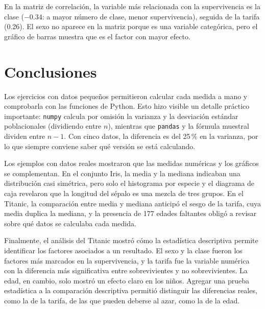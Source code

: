 \documentclass[11pt,letterpaper]{article}
\begin{document}
En la matriz de correlación, la variable más relacionada con la supervivencia es la clase ($-0.34$: a mayor número de clase, menor supervivencia), seguida de la tarifa (0.26). El sexo no aparece en la matriz porque es una variable categórica, pero el gráfico de barras muestra que es el factor con mayor efecto.

\section{Conclusiones}

Los ejercicios con datos pequeños permitieron calcular cada medida a mano y comprobarla con las funciones de Python. Esto hizo visible un detalle práctico importante: \texttt{numpy} calcula por omisión la varianza y la desviación estándar poblacionales (dividiendo entre $n$), mientras que \texttt{pandas} y la fórmula muestral dividen entre $n - 1$. Con cinco datos, la diferencia es del 25\,\% en la varianza, por lo que siempre conviene saber qué versión se está calculando.

Los ejemplos con datos reales mostraron que las medidas numéricas y los gráficos se complementan. En el conjunto Iris, la media y la mediana indicaban una distribución casi simétrica, pero solo el histograma por especie y el diagrama de caja revelaron que la longitud del sépalo es una mezcla de tres grupos. En el Titanic, la comparación entre media y mediana anticipó el sesgo de la tarifa, cuya media duplica la mediana, y la presencia de 177 edades faltantes obligó a revisar sobre qué datos se calculaba cada medida.

Finalmente, el análisis del Titanic mostró cómo la estadística descriptiva permite identificar los factores asociados a un resultado. El sexo y la clase fueron los factores más marcados en la supervivencia, y la tarifa fue la variable numérica con la diferencia más significativa entre sobrevivientes y no sobrevivientes. La edad, en cambio, solo mostró un efecto claro en los niños. Agregar una prueba estadística a la comparación descriptiva permitió distinguir las diferencias reales, como la de la tarifa, de las que pueden deberse al azar, como la de la edad.

\end{document}
